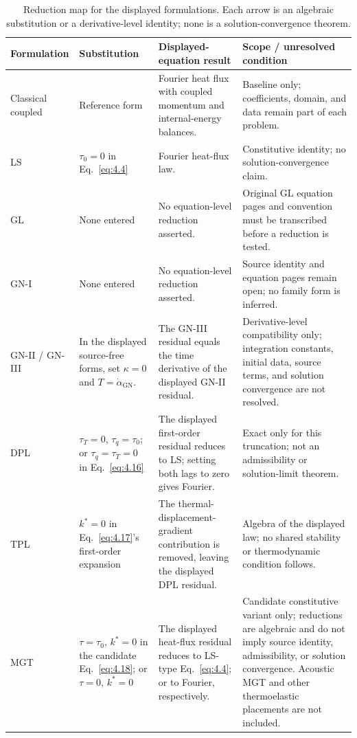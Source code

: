 \begin{table}[htbp]
\centering
\scriptsize
\caption{Reduction map for the displayed formulations. Each arrow is an algebraic substitution or a derivative-level identity; none is a solution-convergence theorem.}
\label{tab:q1-reduction-map}
\setlength{\tabcolsep}{3pt}
\renewcommand{\arraystretch}{1.12}
\begin{tabularx}{\textwidth}{@{}p{2.0cm}p{3.2cm}X p{4.0cm}@{}}
\toprule
\textbf{Formulation} & \textbf{Substitution} & \textbf{Displayed-equation result} & \textbf{Scope / unresolved condition} \\
\midrule
Classical coupled & Reference form & Fourier heat flux with coupled momentum and internal-energy balances. & Baseline only; coefficients, domain, and data remain part of each problem. \\
LS & $\tau_0=0$ in Eq.~\eqref{eq:4.4} & Fourier heat-flux law. & Constitutive identity; no solution-convergence claim. \\
GL & None entered & No equation-level reduction asserted. & Original GL equation pages and convention must be transcribed before a reduction is tested. \\
GN-I & None entered & No equation-level reduction asserted. & Source identity and equation pages remain open; no family form is inferred. \\
GN-II / GN-III & In the displayed source-free forms, set $\kappa=0$ and $T=\dot\alpha_{\mathrm{GN}}$. & The GN-III residual equals the time derivative of the displayed GN-II residual. & Derivative-level compatibility only; integration constants, initial data, source terms, and solution convergence are not resolved. \\
DPL & $\tau_T=0$, $\tau_q=\tau_0$; or $\tau_q=\tau_T=0$ in Eq.~\eqref{eq:4.16} & The displayed first-order residual reduces to LS; setting both lags to zero gives Fourier. & Exact only for this truncation; not an admissibility or solution-limit theorem. \\
TPL & $k^*=0$ in Eq.~\eqref{eq:4.17}'s first-order expansion & The thermal-displacement-gradient contribution is removed, leaving the displayed DPL residual. & Algebra of the displayed law; no shared stability or thermodynamic condition follows. \\
MGT & $\tau=\tau_0$, $k^*=0$ in the candidate Eq.~\eqref{eq:4.18}; or $\tau=0$, $k^*=0$ & The displayed heat-flux residual reduces to LS-type Eq.~\eqref{eq:4.4}; or to Fourier, respectively. & Candidate constitutive variant only; reductions are algebraic and do not imply source identity, admissibility, or solution convergence. Acoustic MGT and other thermoelastic placements are not included. \\

\end{tabularx}
\end{table}
